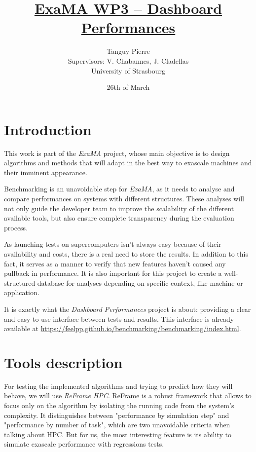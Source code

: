 \documentclass[12pt]{article}
\title{\underline{\textbf{ExaMA WP3 -- Dashboard Performances}}}
\author{Tanguy Pierre\\
            [1cm]
            Supervisors: V. Chabannes, J. Cladellas\\
            [2cm]
            University of Strasbourg}
\date{26th of March}
\begin{document}
    \maketitle      %


\newpage
\section{Introduction}

This work is part of the \textit{ExaMA} project, whose main objective is to design algorithms and methods
that will adapt in the best way to exascale machines and their imminent appearance.

Benchmarking is an unavoidable step for \textit{ExaMA}, as it needs to analyse and compare performances on systems
with different structures. These analyses will not only guide the developer team to improve the scalability of the different available tools,
but also ensure complete transparency during the evaluation process.

As launching tests on supercomputers isn't always easy because of their availability and costs, there is a real need to store the results.
In addition to this fact, it serves as a manner to verify that new features haven't caused any pullback in performance.
It is also important for this project to create a well-structured database for analyses depending on specific context, like machine or application.

It is exactly what the \textit{Dashboard Performances} project is about: providing a clear and easy to use interface between tests and results.
This interface is already available at \url{https://feelpp.github.io/benchmarking/benchmarking/index.html}.


\section{Tools description}

For testing the implemented algorithms and trying to predict how they will behave, we will use \textit{ReFrame HPC}\cite*{ReFrame}.
ReFrame is a robust framework that allows to focus only on the algorithm by isolating the running code from the system's complexity.
It distinguishes between "performance by simulation step" and "performance by number of task", which are two unavoidable criteria when talking about HPC.
But for us, the most interesting feature is its ability to simulate exascale performance with regressions tests.
\end{document}

